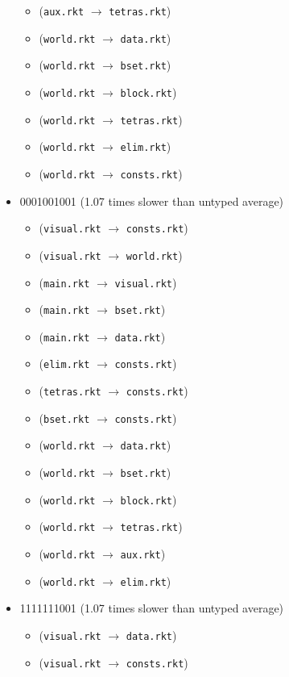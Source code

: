 \documentclass{article}
\newcommand{\mono}[1]{\texttt{#1}}
\begin{document}
\begin{itemize}
\begin{itemize}
  \item (\mono{aux.rkt} $\rightarrow$ \mono{tetras.rkt})
  \item (\mono{world.rkt} $\rightarrow$ \mono{data.rkt})
  \item (\mono{world.rkt} $\rightarrow$ \mono{bset.rkt})
  \item (\mono{world.rkt} $\rightarrow$ \mono{block.rkt})
  \item (\mono{world.rkt} $\rightarrow$ \mono{tetras.rkt})
  \item (\mono{world.rkt} $\rightarrow$ \mono{elim.rkt})
  \item (\mono{world.rkt} $\rightarrow$ \mono{consts.rkt})
  \end{itemize}
\item 0001001001 (1.07 times slower than untyped average)
  \begin{itemize}
  \item (\mono{visual.rkt} $\rightarrow$ \mono{consts.rkt})
  \item (\mono{visual.rkt} $\rightarrow$ \mono{world.rkt})
  \item (\mono{main.rkt} $\rightarrow$ \mono{visual.rkt})
  \item (\mono{main.rkt} $\rightarrow$ \mono{bset.rkt})
  \item (\mono{main.rkt} $\rightarrow$ \mono{data.rkt})
  \item (\mono{elim.rkt} $\rightarrow$ \mono{consts.rkt})
  \item (\mono{tetras.rkt} $\rightarrow$ \mono{consts.rkt})
  \item (\mono{bset.rkt} $\rightarrow$ \mono{consts.rkt})
  \item (\mono{world.rkt} $\rightarrow$ \mono{data.rkt})
  \item (\mono{world.rkt} $\rightarrow$ \mono{bset.rkt})
  \item (\mono{world.rkt} $\rightarrow$ \mono{block.rkt})
  \item (\mono{world.rkt} $\rightarrow$ \mono{tetras.rkt})
  \item (\mono{world.rkt} $\rightarrow$ \mono{aux.rkt})
  \item (\mono{world.rkt} $\rightarrow$ \mono{elim.rkt})
  \end{itemize}
\item 1111111001 (1.07 times slower than untyped average)
  \begin{itemize}
  \item (\mono{visual.rkt} $\rightarrow$ \mono{data.rkt})
  \item (\mono{visual.rkt} $\rightarrow$ \mono{consts.rkt})

\end{itemize}
\end{itemize}
\end{document}

